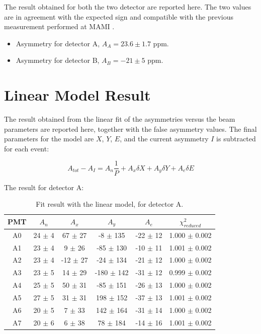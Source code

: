 The result obtained for both the two detector are reported here. The two values are in agreement with the expected sign and compatible with the previous measurement performed at MAMI \cite{Esser:2018vdp}. 

\begin{itemize}
\item Asymmetry for detector A, $A_{A} =  23.6 \pm 1.7$ ppm.
\item Asymmetry for detector B, $A_{B} = -21 \pm 5$ ppm.
\end{itemize}

\newpage
\section{Linear Model Result}
The result obtained from the linear fit of the asymmetries versus the beam parameters are reported here, together with the false asymmetry values. The final parameters for the model are $X$, $Y$, $E$, and the current asymmetry $I$ is subtracted for each event:

\begin{equation}
A_{tot} - A_{I} = A_{n} \frac{1}{P} + A_{x} \delta X + A_{y} \delta Y + A_{e} \delta E
\end{equation}

The result for detector A: 

\begin{table}[hbtp] 
\centering
\begin{tabular}{c|c|c|c|c|c}
\hline
 PMT   & $A_{n}$    & $A_{x}$          & $A_{y}$            & $A_{e}$         & $\chi^{2}_{reduced}$ \\
\hline
 A0    & 24 $\pm$ 4 & 67 $\pm$ 27  & -8 $\pm$ 135   & -22 $\pm$ 12 & 1.000 $\pm$ 0.002   \\
 A1    & 23 $\pm$ 4 & 9 $\pm$ 26   & -85 $\pm$ 130  & -10 $\pm$ 11 & 1.001 $\pm$ 0.002 \\
 A2    & 23 $\pm$ 4 & -12 $\pm$ 27 & -24 $\pm$ 134  & -21 $\pm$ 12 & 1.000 $\pm$ 0.002   \\
 A3    & 23 $\pm$ 5 & 14 $\pm$ 29  & -180 $\pm$ 142 & -31 $\pm$ 12 & 0.999 $\pm$ 0.002 \\
 A4    & 25 $\pm$ 5 & 50 $\pm$ 31  & -85 $\pm$ 151  & -26 $\pm$ 13 & 1.000 $\pm$ 0.002   \\
 A5    & 27 $\pm$ 5 & 31 $\pm$ 31  & 198 $\pm$ 152  & -37 $\pm$ 13 & 1.001 $\pm$ 0.002 \\
 A6    & 20 $\pm$ 5 & 7 $\pm$ 33   & 142 $\pm$ 164  & -31 $\pm$ 14 & 1.000 $\pm$ 0.002   \\
 A7    & 20 $\pm$ 6 & 6 $\pm$ 38   & 78 $\pm$ 184   & -14 $\pm$ 16 & 1.001 $\pm$ 0.002 \\
\hline
\end{tabular}
\caption{Fit result with the linear model, for detector A.}
\label{tb:resultA}
\end{table}

